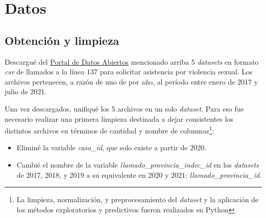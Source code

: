 \documentclass[10 pt]{article}
\begin{document}
\section{Datos}\label{datos}

\subsection{Obtención y limpieza}\label{limpieza}
Descargué del \href{http://datos.jus.gob.ar/}{Portal de Datos Abiertos} mencionado arriba 5 \textit{datasets} en formato \textit{csv} de llamados a la línea 137 para solicitar asistencia por violencia sexual. Los archivos pertenecen, a razón de uno de por año, al período entre enero de 2017 y julio de 2021. 

Una vez descargados, unifiqué los 5 archivos en un solo \textit{dataset}. Para eso fue necesario realizar una primera limpieza destinada a dejar consistentes los distintos archivos en términos de cantidad y nombre de columnas\footnote{La limpieza, normalización, y preprocesamiento del \textit{dataset} y la aplicación de los métodos exploratorios y predictivos fueron realizados en Python}:

\begin{itemize}
    \item Eliminé la variable \textit{caso\_id}, que solo existe a partir de 2020.
    \item Cambié el nombre de la variable \textit{llamado\_provincia\_indec\_id} en los \textit{datasets} de 2017, 2018, y 2019 a su equivalente en 2020 y 2021: \textit{llamado\_provincia\_id}.
\end{itemize}
\end{document}
